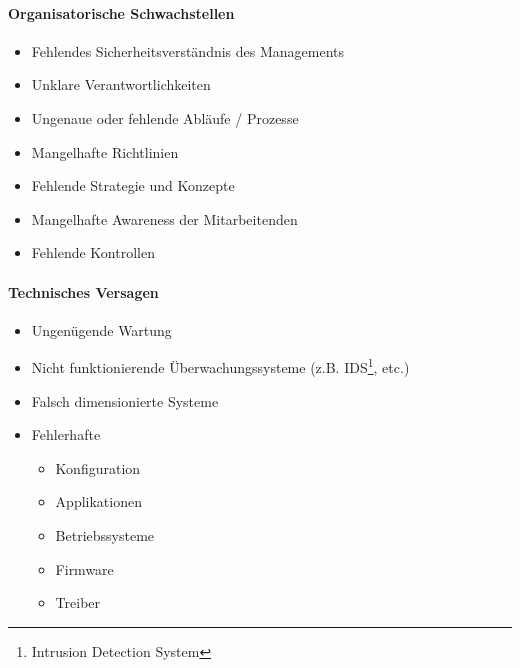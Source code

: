 \paragraph*{Organisatorische Schwachstellen}
\begin{itemize}
    \item Fehlendes Sicherheitsverständnis des Managements
    \item Unklare Verantwortlichkeiten
    \item Ungenaue oder fehlende Abläufe / Prozesse
    \item Mangelhafte Richtlinien
    \item Fehlende Strategie und Konzepte
    \item Mangelhafte Awareness der Mitarbeitenden
    \item Fehlende Kontrollen
\end{itemize}

\paragraph*{Technisches Versagen}
\begin{itemize}
    \item Ungenügende Wartung
    \item Nicht funktionierende Überwachungssysteme (z.B. IDS\footnote{Intrusion Detection System}, etc.)
    \item Falsch dimensionierte Systeme
    \item Fehlerhafte
    \begin{itemize}
        \item Konfiguration
        \item Applikationen
        \item Betriebssysteme
        \item Firmware
        \item Treiber
    \end{itemize}
\end{itemize}


